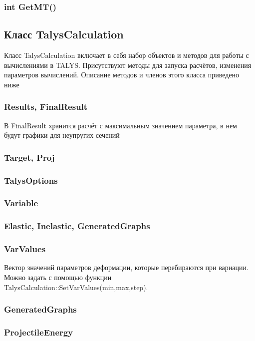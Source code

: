 \documentclass[a4paper,12pt]{extarticle}
\begin{document}
\subsubsection{int GetMT()}

\subsection{Класс TalysCalculation}
Класс TalysCalculation включает в себя набор объектов и методов для работы с вычислениями в TALYS. Присутствуют методы для запуска расчётов, изменения параметров вычислений. Описание методов и членов этого класса приведено ниже
\subsubsection{Results, FinalResult}
В FinalResult хранится расчёт с максимальным значением параметра, в нем будут графики для неупругих сечений
\subsubsection{Target, Proj}

\subsubsection{TalysOptions}

\subsubsection{Variable}

\subsubsection{Elastic, Inelastic, GeneratedGraphs}

\subsubsection{VarValues}
Вектор значений параметров деформации, которые перебираются при вариации. Можно задать с помощью функции TalysCalculation::SetVarValues(min,max,step).
\subsubsection{GeneratedGraphs}

\subsubsection{ProjectileEnergy}
\end{document}
